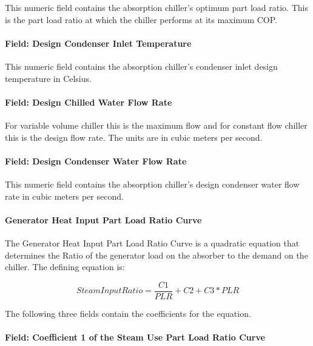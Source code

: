 This numeric field contains the absorption chiller's optimum part load ratio. This is the part load ratio at which the chiller performs at its maximum COP.

\paragraph{Field: Design Condenser Inlet Temperature}\label{field-design-condenser-inlet-temperature}

This numeric field contains the absorption chiller's condenser inlet design temperature in Celsius.

\paragraph{Field: Design Chilled Water Flow Rate}\label{field-design-chilled-water-flow-rate}

For variable volume chiller this is the maximum flow and for constant flow chiller this is the design flow rate. The units are in cubic meters per second.

\paragraph{Field: Design Condenser Water Flow Rate}\label{field-design-condenser-water-flow-rate}

This numeric field contains the absorption chiller's design condenser water flow rate in cubic meters per second.

\paragraph{Generator Heat Input Part Load Ratio Curve}\label{generator-heat-input-part-load-ratio-curve}

The Generator Heat Input Part Load Ratio Curve is a quadratic equation that determines the Ratio of the generator load on the absorber to the demand on the chiller. The defining equation is:

\begin{equation}
SteamInputRatio = \frac{{C1}}{{PLR}} + C2 + C3 * PLR
\end{equation}

The following three fields contain the coefficients for the equation.

\paragraph{Field: Coefficient 1 of the Steam Use Part Load Ratio Curve}\label{field-coefficient-1-of-the-steam-use-part-load-ratio-curve}

